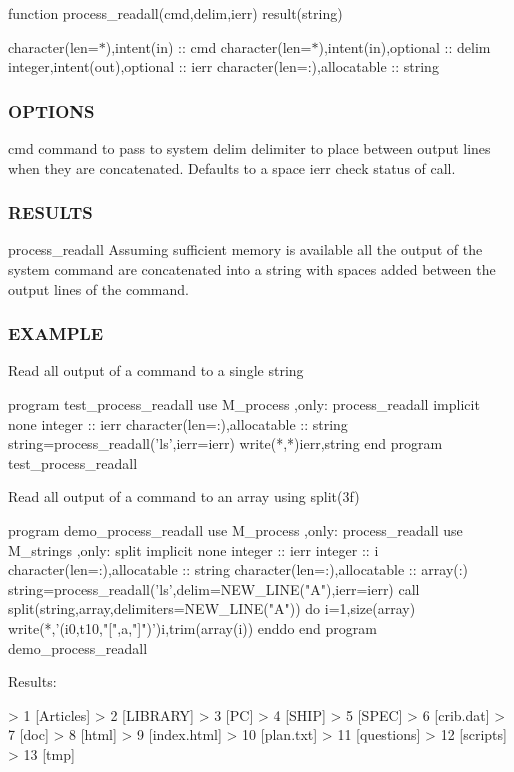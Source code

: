 function process\+\_\+readall(cmd,delim,ierr) result(string)

character(len=$\ast$),intent(in) \+:\+: cmd character(len=$\ast$),intent(in),optional \+:\+: delim integer,intent(out),optional \+:\+: ierr character(len=\+:),allocatable \+:\+: string \subsubsection*{O\+P\+T\+I\+O\+NS}

cmd command to pass to system delim delimiter to place between output lines when they are concatenated. Defaults to a space ierr check status of call. \subsubsection*{R\+E\+S\+U\+L\+TS}

process\+\_\+readall Assuming sufficient memory is available all the output of the system command are concatenated into a string with spaces added between the output lines of the command. \subsubsection*{E\+X\+A\+M\+P\+LE}

Read all output of a command to a single string \begin{DoxyVerb} program test_process_readall
 use M_process ,only: process_readall
 implicit none
 integer :: ierr
 character(len=:),allocatable :: string
    string=process_readall('ls',ierr=ierr)
    write(*,*)ierr,string
 end program test_process_readall
\end{DoxyVerb}


Read all output of a command to an array using split(3f) \begin{DoxyVerb} program demo_process_readall
 use M_process ,only: process_readall
 use M_strings ,only: split
 implicit none
 integer                      :: ierr
 integer                      :: i
 character(len=:),allocatable :: string
 character(len=:),allocatable :: array(:)
    string=process_readall('ls',delim=NEW_LINE("A"),ierr=ierr)
    call split(string,array,delimiters=NEW_LINE("A"))
    do i=1,size(array)
       write(*,'(i0,t10,"[",a,"]")')i,trim(array(i))
    enddo
 end program demo_process_readall
\end{DoxyVerb}


Results\+: \begin{DoxyVerb}> 1     [Articles]
> 2     [LIBRARY]
> 3     [PC]
> 4     [SHIP]
> 5     [SPEC]
> 6     [crib.dat]
> 7     [doc]
> 8     [html]
> 9     [index.html]
> 10    [plan.txt]
> 11    [questions]
> 12    [scripts]
> 13    [tmp]
\end{DoxyVerb}


